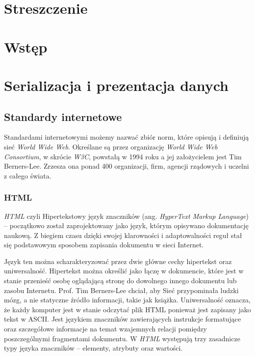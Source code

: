 \documentclass{iiuwb}
\begin{document}
\tableofcontents



\cleardoublepage
\chapter*{Streszczenie}
\label{cha:Streszczenie}


\cleardoublepage
\chapter*{Wstęp}                        %
\label{cha:Wstep}                       %

\cleardoublepage
\chapter{Serializacja i prezentacja danych}
\label{cha:Serializacja i prezentacja danych}

\section{Standardy internetowe}

Standardami internetowymi możemy nazwać zbiór norm, które opisują i definiują sieć \textit{World Wide Web}. Określane są przez organizację \textit{World Wide Web Consortium}, w skrócie \textit{W3C}, powstałą w 1994 roku a jej założycielem jest Tim Berners-Lee. Zrzesza ona ponad 400 organizacji, firm, agencji rządowych i uczelni z całego świata. 

\subsection{HTML}

\textit{HTML} \cite{Berjon:14:H} czyli Hipertekstowy język znaczników (ang. \textit{HyperText Markup Language}) -- początkowo został zaprojektowany jako język, którym opisywano dokumentację naukową. Z biegiem czasu dzięki swojej klarowności i adaptowalności reguł  stał się podstawowym sposobem zapisania dokumentu w sieci Internet. 

Język ten można scharakteryzować przez dwie główne cechy hipertekst oraz uniwersalność. Hipertekst można określić jako łączę w dokumencie, które jest w stanie przenieść osobę oglądającą stronę do dowolnego innego dokumentu lub zasobu Internetu. Prof. Tim Berners-Lee chciał, aby Sieć przypominała ludzki mózg, a nie statyczne źródło informacji, takie jak książka. Uniwersalność oznacza, że każdy komputer jest w stanie odczytać plik HTML ponieważ jest zapisany jako tekst w ASCII. Jest językiem znaczników zawierających instrukcje formatujące oraz szczegółowe informacje na temat wzajemnych relacji pomiędzy poszczególnymi fragmentami dokumentu. W \textit{HTML} występują trzy zasadnicze typy języka znaczników -- elementy, atrybuty oraz wartości.
\end{document}
